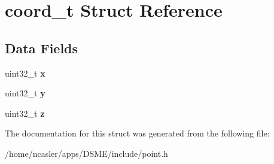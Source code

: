 \hypertarget{structcoord__t}{}\section{coord\+\_\+t Struct Reference}
\label{structcoord__t}
\subsection*{Data Fields}
\begin{DoxyCompactItemize}
\item 
\hypertarget{structcoord__t_a9b55fa0e546159121a030db54021dba6}{}uint32\+\_\+t {\bfseries x}\label{structcoord__t_a9b55fa0e546159121a030db54021dba6}

\item 
\hypertarget{structcoord__t_a1edb2f190d23582bdd512804305d5ecb}{}uint32\+\_\+t {\bfseries y}\label{structcoord__t_a1edb2f190d23582bdd512804305d5ecb}

\item 
\hypertarget{structcoord__t_aa9ad690a5e48f7da6a6a00504916aaaf}{}uint32\+\_\+t {\bfseries z}\label{structcoord__t_aa9ad690a5e48f7da6a6a00504916aaaf}

\end{DoxyCompactItemize}


The documentation for this struct was generated from the following file\+:\begin{DoxyCompactItemize}
\item 
/home/ncasler/apps/\+D\+S\+M\+E/include/point.\+h\end{DoxyCompactItemize}
